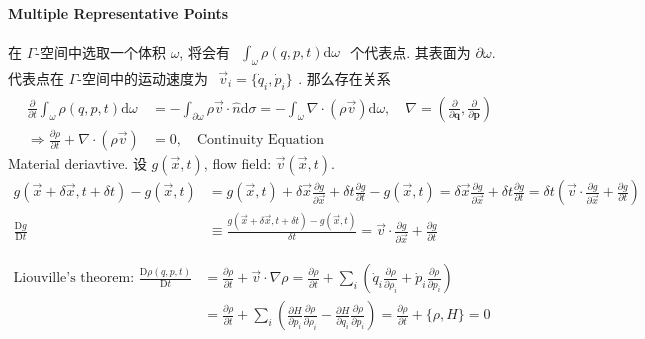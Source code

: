 \documentclass[../../main.tex]{subfiles}
\begin{document}
\paragraph{Multiple Representative Points}
在 $\Gamma$-空间中选取一个体积 $\omega$, 将会有 $\begin{aligned}
    \int_{\omega}\rho(q,p,t)\mathrm{d}\omega
\end{aligned}$ 个代表点. 其表面为 $\partial\omega$. 代表点在 $\Gamma$-空间中的运动速度为 $\begin{aligned}
    \vec{v}_{i} = \{\dot{q}_{i},\dot{p}_{i}\}
\end{aligned}$. 那么存在关系
\begin{align*}
    \frac{\partial}{\partial t}\int_{\omega}\rho(q,p,t)\mathrm{d}\omega &= -\int_{\partial\omega}\rho\vec{v}\cdot\hat{n}\mathrm{d}\sigma = - \int_{\omega}\nabla\cdot(\rho\vec{v})\mathrm{d}\omega,\quad \nabla = \left(\frac{\partial}{\partial \mathbf{q}}, \frac{\partial}{\partial \mathbf{p}}\right)\\
    \Rightarrow \frac{\partial\rho}{\partial t} + \nabla\cdot(\rho\vec{v}) &= 0,\quad \text{Continuity Equation}
\end{align*}
Material deriavtive. 设 $g(\vec{x},t)$, flow field: $\vec{v}(\vec{x},t)$. 
\begin{align*}
    g(\vec{x}+\delta\vec{x},t+\delta t) - g(\vec{x},t) &= g(\vec{x},t) + \delta\vec{x}\frac{\partial g}{\partial\vec{x}} + \delta t\frac{\partial g}{\partial t} - g(\vec{x},t) = \delta\vec{x}\frac{\partial g}{\partial\vec{x}} + \delta t\frac{\partial g}{\partial t} = \delta t\left(\vec{v}\cdot\frac{\partial g}{\partial\vec{x}} + \frac{\partial g}{\partial t}\right)\\
    \frac{\mathrm{D}g}{\mathrm{D}t} &\equiv \frac{g(\vec{x}+\delta\vec{x},t+\delta t) - g(\vec{x},t)}{\delta t} = \vec{v}\cdot\frac{\partial g}{\partial \vec{x}} + \frac{\partial g}{\partial t}
\end{align*}
 
$\begin{aligned}
    \text{Liouville's theorem: }\frac{\mathrm{D}\rho(q,p,t)}{\mathrm{D}t} &= \frac{\partial\rho}{\partial t} + \vec{v}\cdot\nabla\rho
    = \frac{\partial\rho}{\partial t} + \sum_{i}\left(\dot{q}_{i}\frac{\partial\rho}{\partial\rho_{i}} + \dot{p}_{i}\frac{\partial\rho}{\partial p_{i}}\right)\\
    & = \frac{\partial\rho}{\partial t} + \sum_{i}\left(\frac{\partial H}{\partial p_{i}}\frac{\partial\rho}{\partial\rho_{i}} - \frac{\partial H}{\partial q_{i}}\frac{\partial\rho}{\partial p_{i}}\right)= \boxed{\frac{\partial \rho}{\partial t} + \{\rho, H\} = 0}
\end{aligned}$
\end{document}
